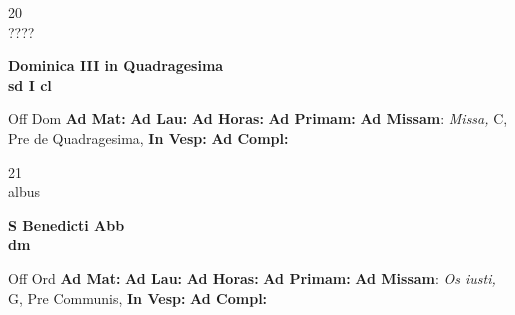 \documentclass[10pt, openany]{book}
\begin{document}
    \begin{center}
        \begin{minipage}{3.5in}
            \vspace{2em}
            \begin{minipage}{0.5in}
                {\Huge 20} \\
                {\normalsize ????}
            \end{minipage}
            \begin{minipage}{3.0in}
                \textbf{ \large Dominica III in Quadragesima \\
                \textnormal{\normalsize sd I cl}}

            \end{minipage}
            \begin{justify}Off Dom
                \textbf{Ad Mat: }
                \textbf{Ad Lau: }
                \textbf{Ad Horas: }
                \textbf{Ad Primam: }\textbf{Ad Missam}: \textit{Missa,} C, Pre de Quadragesima, 
                \textbf{In Vesp: }
                \textbf{Ad Compl: }
            \end{justify}
        \end{minipage}
    \end{center}

    \begin{center}
        \begin{minipage}{3.5in}
            \vspace{2em}
            \begin{minipage}{0.5in}
                {\Huge 21} \\
                {\normalsize albus}
            \end{minipage}
            \begin{minipage}{3.0in}
                \textbf{ \large S Benedicti Abb \\
                \textnormal{\normalsize dm}}

            \end{minipage}
            \begin{justify}Off Ord
                \textbf{Ad Mat: }
                \textbf{Ad Lau: }
                \textbf{Ad Horas: }
                \textbf{Ad Primam: }\textbf{Ad Missam}: \textit{Os iusti,} G, Pre Communis, 
                \textbf{In Vesp: }
                \textbf{Ad Compl: }
            \end{justify}
        \end{minipage}
    \end{center}
\end{document}
